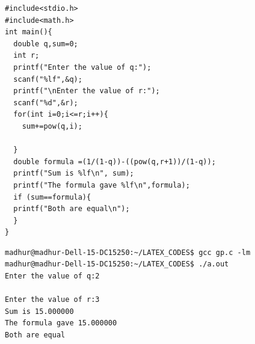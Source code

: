 \documentclass{article}
\begin{document}
\begin{verbatim}
#include<stdio.h>
#include<math.h>
int main(){
  double q,sum=0;
  int r;
  printf("Enter the value of q:");
  scanf("%lf",&q);
  printf("\nEnter the value of r:");
  scanf("%d",&r);
  for(int i=0;i<=r;i++){
    sum+=pow(q,i);
    
  }
  double formula =(1/(1-q))-((pow(q,r+1))/(1-q));
  printf("Sum is %lf\n", sum);
  printf("The formula gave %lf\n",formula);
  if (sum==formula){
  printf("Both are equal\n");
  }
}   
\end{verbatim}

\begin{lstlisting}[style=terminal]
madhur@madhur-Dell-15-DC15250:~/LATEX_CODES$ gcc gp.c -lm
madhur@madhur-Dell-15-DC15250:~/LATEX_CODES$ ./a.out
Enter the value of q:2

Enter the value of r:3
Sum is 15.000000
The formula gave 15.000000
Both are equal
\end{lstlisting}
    
\end{document}
